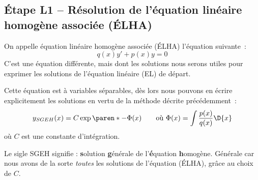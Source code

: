 \subsection[L1 -- Résolution de l'ÉLHA]{Étape L1 -- Résolution de l'équation linéaire homogène associée (ÉLHA)}
\begin{frame}
  On appelle \og équation linéaire homogène associée\fg{} (ÉLHA) l'équation suivante~:\pause{}
  \begin{equation*}
    q(x) y' +  p(x) y = 0 \tag{ÉLHA}
  \end{equation*}\pause
  C'est une équation \alert{différente}\pause{}, mais dont les solutions nous serons utiles\pause{} pour exprimer les solutions de l'équation linéaire (EL) de départ.\pause{}

Cette équation est à variables séparables\pause{}, dès lors nous pouvons en écrire explicitement les solutions en vertu de la méthode décrite précédemment~:\pause{}
\begin{equation*}
  y_{SGEH}(x) = C \exp{\paren*{-\Phi(x)}} \qquad\text{où \(\Phi(x) = \int \frac{p(x)}{q(x)}\D{x}\)}
\end{equation*}\pause
où \(C\) est une constante d'intégration.\pause{}

Le sigle SGEH signifie\pause{} : \textbf{s}olution\pause{} \textbf{g}énérale\pause{} de l'\textbf{é}quation\pause{} \textbf{h}omogène.\pause{} \og Générale\fg{} car\pause{} nous avons de la sorte \emph{toutes} les solutions de l'équation (ÉLHA), grâce au choix de \(C\).
\end{frame}

